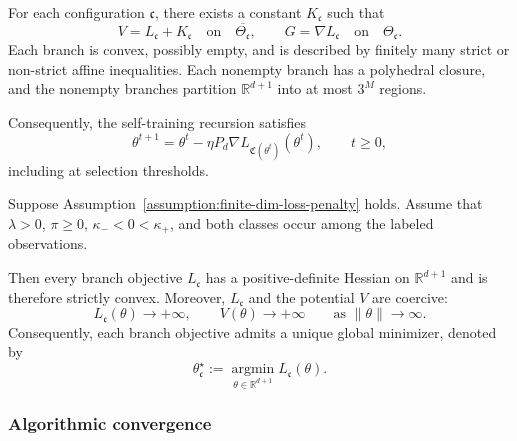 \begin{proposition}
\label{prop:configuration-branch-formulation}
For each configuration $\mathfrak c$, there exists a constant
$K_{\mathfrak c}$ such that
\[
    V=L_{\mathfrak c}+K_{\mathfrak c}
        \quad\text{on}\quad\overline{\Theta_{\mathfrak c}},
    \qquad
    G=\nabla L_{\mathfrak c}
        \quad\text{on}\quad\Theta_{\mathfrak c}.
\]
Each branch is convex, possibly empty, and is described by finitely
many strict or non-strict affine inequalities.
Each nonempty branch has a polyhedral closure, and the nonempty
branches partition $\mathbb R^{d+1}$ into at most $3^M$ regions.
\end{proposition}
Consequently, the self-training recursion satisfies
\[
    \theta^{t+1}
    =
    \theta^t-\eta P_d
    \nabla L_{\mathfrak C(\theta^t)}(\theta^t),
    \qquad t\geq0,
\]
including at selection thresholds.
\begin{proposition}
\label{prop:branch-convexity-coercivity}
Suppose Assumption~\ref{assumption:finite-dim-loss-penalty} holds.
Assume that $\lambda>0$, $\pi\geq0$, $\kappa_-<0<\kappa_+$,
and both classes occur among the labeled observations.

Then every branch objective $L_{\mathfrak c}$ has a
positive-definite Hessian on $\mathbb R^{d+1}$ and is therefore
strictly convex. Moreover, $L_{\mathfrak c}$ and the potential
$V$ are coercive:
\[
    L_{\mathfrak c}(\theta)\longrightarrow+\infty,
    \qquad
    V(\theta)\longrightarrow+\infty
    \qquad\text{as }\|\theta\|\longrightarrow\infty.
\]
Consequently, each branch objective admits a unique global minimizer,
denoted by
\[
    \theta_{\mathfrak c}^\star
    :=
    \operatorname*{argmin}_{\theta\in\mathbb R^{d+1}}
        L_{\mathfrak c}(\theta).
\]
\end{proposition}


\subsubsection{Algorithmic convergence}

